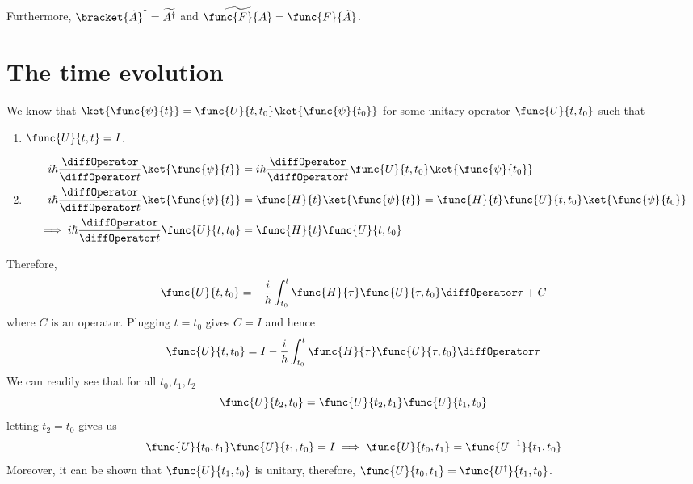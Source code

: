  Furthermore, \(\bracket{\tilde{A}}^{\dagger} = \widetilde{A^{\dagger}}\) and \(\widetilde{\func{F}{A}} = \func{F}{\tilde{A}}\).

\section{The time evolution}
We know that \(\ket{\func{\psi}{t}} = \func{U}{t,t_0} \ket{\func{\psi}{t_0}}\) for some unitary operator \(\func{U}{t,t_0}\) such that
\begin{enumerate}
    \item \(\func{U}{t,t} = I\).
    \item
          \begin{align*}
              i\hbar \dfrac{\diffOperator }{\diffOperator t} \ket{\func{\psi}{t}}      & = i \hbar  \dfrac{\diffOperator }{\diffOperator t} \func{U}{t,t_0}\ket{\func{\psi}{t_0}} \\
              i\hbar \dfrac{\diffOperator }{\diffOperator t} \ket{\func{\psi}{t}}      & = \func{H}{t} \ket{\func{\psi}{t}} = \func{H}{t} \func{U}{t,t_0} \ket{\func{\psi}{t_0}}  \\
              \implies  i\hbar \dfrac{\diffOperator }{\diffOperator t} \func{U}{t,t_0} & = \func{H}{t} \func{U}{t,t_0}
          \end{align*}
\end{enumerate}
Therefore,
\begin{equation*}
    \func{U}{t,t_0}  = -\frac{i}{\hbar} \int_{t_0}^t \func{H}{\tau} \func{U}{\tau,t_0} \diffOperator \tau + C
\end{equation*}
where \(C\) is an operator. Plugging \(t = t_0\) gives \(C = I\) and hence
\begin{equation*}
    \func{U}{t,t_0} = I -\frac{i}{\hbar} \int_{t_0}^t \func{H}{\tau} \func{U}{\tau,t_0} \diffOperator \tau
\end{equation*}
We can readily see that for all \(t_0,t_1,t_2\)
\begin{equation*}
    \func{U}{t_2,t_0} = \func{U}{t_2,t_1} \func{U}{t_1,t_0}
\end{equation*}
letting \(t_2 = t_0\) gives us
\begin{equation*}
    \func{U}{t_0, t_1} \func{U}{t_1, t_0} = I \implies \func{U}{t_0,t_1} = \func{U^{-1}}{t_1,t_0}
\end{equation*}
Moreover, it can be shown that \(\func{U}{t_1,t_0}\) is unitary, therefore, \(\func{U}{t_0,t_1} = \func{U^{\dagger}}{t_1,t_0}\).
